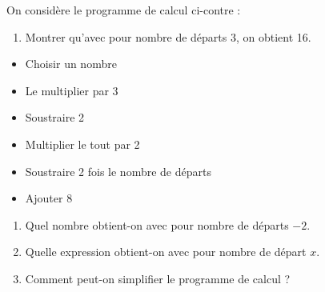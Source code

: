 \begin{minipage}[t]{0.65\textwidth}
    \vspace*{-1.5em}

    On considère le programme de calcul ci-contre :

    \begin{enumerate}
        \item Montrer qu'avec pour nombre de départs 3, on obtient 16.\vspace{2.2cm}
    \end{enumerate}
\end{minipage}
\hfil
\begin{minipage}[t]{0.32\textwidth}
    \begin{itemize}
        \item Choisir un nombre
        \item Le multiplier par 3
        \item Soustraire 2
        \item Multiplier le tout par 2
        \item Soustraire 2 fois le nombre de départs
        \item Ajouter 8
    \end{itemize}
\end{minipage}
\begin{enumerate}[start=2]
    \item Quel nombre obtient-on avec pour nombre de départs $-2$.\vspace{2.4cm}
    \item Quelle expression obtient-on avec pour nombre de départ $x$.\vspace{2.4cm}
    \item Comment peut-on simplifier le programme de calcul ?\vspace{2.4cm}
\end{enumerate}



